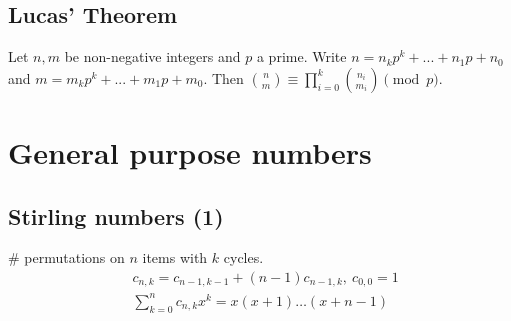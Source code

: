 	\subsection{Lucas' Theorem}
		Let $n,m$ be non-negative integers and $p$ a prime. Write $n=n_kp^k+...+n_1p+n_0$ and $m=m_kp^k+...+m_1p+m_0$. Then $\binom{n}{m} \equiv \prod_{i=0}^k\binom{n_i}{m_i} \pmod{p}$.


\section{General purpose numbers}


	\subsection{Stirling numbers (1)}
		\# permutations on $n$ items with $k$ cycles.
		\begin{align*}
			&c_{n,k} = c_{n-1,k-1} + (n-1) c_{n-1,k},\ c_{0,0} = 1 \\
			&\textstyle \sum_{k=0}^n c_{n,k}x^k = x(x+1) \dots (x+n-1)
		\end{align*}

